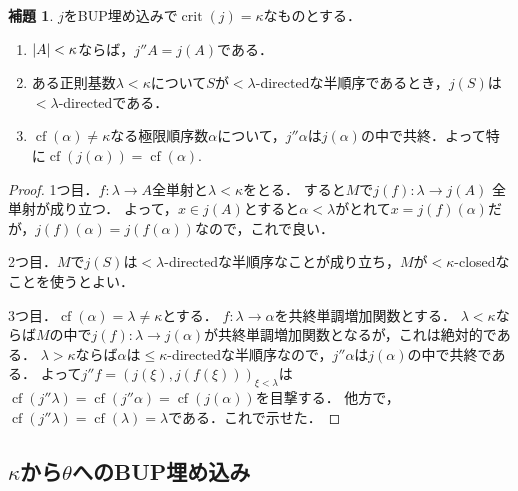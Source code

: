 \documentclass[uplatex,dvipdfmx]{jsarticle}
\newcommand{\cf}{\operatorname{cf}}
\newcommand{\crit}{\operatorname{crit}}
\DeclarePairedDelimiter\abs{\lvert}{\rvert}
\theoremstyle{definition}
\newtheorem{lem}[thm]{補題}
\begin{document}
	\begin{lem}
		$j$をBUP埋め込みで$\crit(j) = \kappa$なものとする．
		\begin{enumerate}
			\item $\abs{A} < \kappa$ならば，$j''A = j(A)$である．
			\item ある正則基数$\lambda < \kappa$について$S$が${<}\lambda$-directedな半順序であるとき，$j(S)$は${<}\lambda$-directedである．
			\item $\cf(\alpha) \ne \kappa$なる極限順序数$\alpha$について，$j''\alpha$は$j(\alpha)$の中で共終．よって特に$\cf(j(\alpha)) = \cf(\alpha)$.
		\end{enumerate}
	\end{lem}
	\begin{proof}
		1つ目．$f \colon \lambda \to A$全単射と$\lambda < \kappa$をとる．
		すると$M$で$j(f) \colon \lambda \to j(A)$ 全単射が成り立つ．
		よって，$x \in j(A)$とすると$\alpha < \lambda$がとれて$x = j(f)(\alpha)$だが，$j(f)(\alpha) = j(f(\alpha))$なので，これで良い．

		2つ目．$M$で$j(S)$は${<}\lambda$-directedな半順序なことが成り立ち，$M$が${<}\kappa$-closedなことを使うとよい．

		3つ目．$\cf(\alpha) = \lambda \ne \kappa$とする．
		$f \colon \lambda \to \alpha$を共終単調増加関数とする．
		$\lambda < \kappa$ならば$M$の中で$j(f) \colon \lambda \to j(\alpha)$が共終単調増加関数となるが，これは絶対的である．
		$\lambda > \kappa$ならば$\alpha$は${\le}\kappa$-directedな半順序なので，$j''\alpha$は$j(\alpha)$の中で共終である．
		よって$j''f = (j(\xi), j(f(\xi)))_{\xi < \lambda}$は$\cf(j'' \lambda) = \cf(j '' \alpha) = \cf(j(\alpha))$を目撃する．
		他方で，$\cf(j''\lambda) = \cf(\lambda) = \lambda$である．これで示せた．
	\end{proof}

	\subsection{$\kappa$から$\theta$へのBUP埋め込み}
\end{document}
